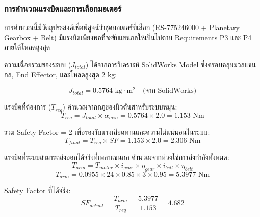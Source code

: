 \subsubsection{การคำนวณแรงบิดและการเลือกมอเตอร์}
\label{subsubsec:motor_torque_calculation}

การคำนวณนี้มีวัตถุประสงค์เพื่อพิสูจน์ว่าชุดมอเตอร์ที่เลือก (RS-775246000 + Planetary Gearbox + Belt) มีแรงบิดเพียงพอที่จะขับแขนกลให้เป็นไปตาม Requirements P3 และ P4 ภายใต้โหลดสูงสุด

ความเฉื่อยรวมของระบบ ($J_{total}$) ได้จากการวิเคราะห์ SolidWorks Model ซึ่งครอบคลุมมวลแขนกล, End Effector, และโหลดสูงสุด 2 kg:


\begin{equation}
    J_{total} = 0.5764 \text{ kg}\cdot\text{m}^2 \quad \text{(จาก SolidWorks)}
    \label{eq:inertia_total}
\end{equation}

แรงบิดที่ต้องการ ($T_{req}$) คำนวณจากกฎของนิวตันสำหรับระบบหมุน:
\begin{equation}
    T_{req} = J_{total} \times \alpha_{min} = 0.5764 \times 2.0 = 1.153 \text{ Nm}
    \label{eq:torque_required}
\end{equation}

รวม Safety Factor = 2 เพื่อรองรับแรงเสียดทานและความไม่แน่นอนในระบบ:
\begin{equation}
    T_{final} = T_{req} \times SF = 1.153 \times 2.0 = 2.306 \text{ Nm}
    \label{eq:torque_final}
\end{equation}

แรงบิดที่ระบบสามารถส่งออกได้จริงที่เพลาแขนกล คำนวณจากห่วงโซ่การส่งกำลังทั้งหมด:
\begin{equation}
    T_{arm} = T_{motor} \times i_{gear} \times \eta_{gear} \times i_{belt} \times \eta_{belt}
    \label{eq:torque_arm_formula}
\end{equation}
\begin{equation}
    T_{arm} = 0.0955 \times 24 \times 0.85 \times 3 \times 0.95 = 5.3977 \text{ Nm}
    \label{eq:torque_arm_result}
\end{equation}

Safety Factor ที่ได้จริง:
\begin{equation}
    SF_{actual} = \frac{T_{arm}}{T_{req}} = \frac{5.3977}{1.153} = 4.682
    \label{eq:safety_factor_actual}
\end{equation}

